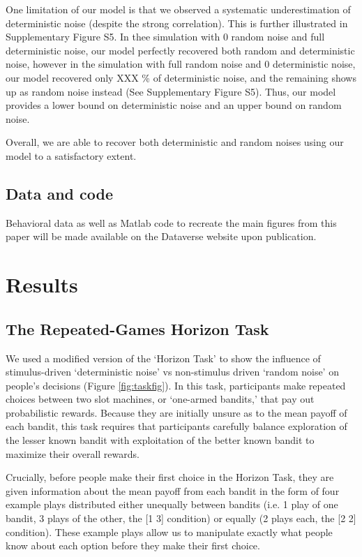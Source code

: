\documentclass[12pt]{article}
\begin{document}
	One limitation of our model is that we observed a systematic underestimation of deterministic noise (despite the strong correlation). This is further illustrated in Supplementary Figure S5. In thee simulation with 0 random noise and full deterministic noise, our model perfectly recovered both random and deterministic noise, however in the simulation with full random noise and 0 deterministic noise, our model recovered only XXX \% of deterministic noise, and the remaining shows up as random noise instead (See Supplementary Figure S5). Thus, our model provides a lower bound on deterministic noise and an upper bound on random noise.
	
	Overall, we are able to recover both deterministic and random noises using our model to a satisfactory extent.
	
	\subsection*{Data and code}
	Behavioral data as well as Matlab code to recreate the main figures from this paper will be made available on the Dataverse website upon publication. %
	
	\section*{Results}
	
	\subsection*{The Repeated-Games Horizon Task}
	We used a modified version of the `Horizon Task' \citep{wilson2014} to show the influence of stimulus-driven `deterministic noise' vs non-stimulus driven `random noise' on people's decisions (Figure \ref{fig:taskfig}). In this task, participants make repeated choices between two slot machines, or `one-armed bandits,' that pay out probabilistic rewards. Because they are initially unsure as to the mean payoff of each bandit, this task requires that participants carefully balance exploration of the lesser known bandit with exploitation of the better known bandit to maximize their overall rewards. 
	
	Crucially, before people make their first choice in the Horizon Task, they are given information about the mean payoff from each bandit in the form of four example plays distributed either unequally between bandits (i.e. 1 play of one bandit, 3 plays of the other, the [1 3] condition) or equally (2 plays each, the [2 2] condition). These example plays allow us to manipulate exactly what people know about each option before they make their first choice. 
	
\end{document}
